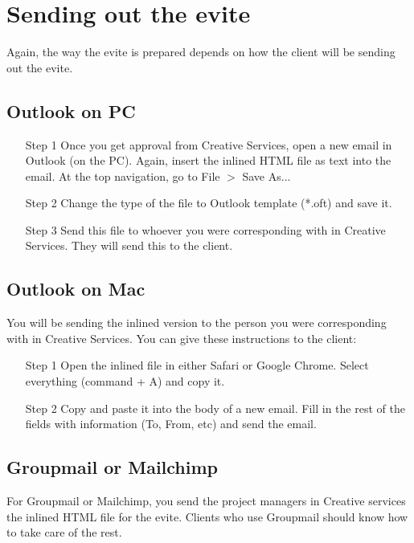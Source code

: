 \documentclass[a4paper,11pt]{article}
\begin{document}
	\section{Sending out the evite}
	Again, the way the evite is prepared depends on how the client will be sending out the evite.
	\subsection{Outlook on PC}
	\begin{itemize}
		\item[Step 1] Once you get approval from Creative Services, open a new email in Outlook (on the PC). Again, insert the inlined HTML file as text into the email. At the top navigation, go to File $>$ Save As...
		\item[Step 2] Change the type of the file to Outlook template (*.oft) and save it.
		\item[Step 3] Send this file to whoever you were corresponding with in Creative Services. They will send this to the client.
	\end{itemize}
	\subsection{Outlook on Mac}
	You will be sending the inlined version to the person you were corresponding with in Creative Services. You can give these instructions to the client:
	\begin{itemize}
		\item[Step 1] Open the inlined file in either Safari or Google Chrome. Select everything (command + A) and copy it.
		\item[Step 2] Copy and paste it into the body of a new email. Fill in the rest of the fields with information (To, From, etc) and send the email.
	\end{itemize}
	\subsection{Groupmail or Mailchimp}
	For Groupmail or Mailchimp, you send the project managers in Creative services the inlined HTML file for the evite. Clients who use Groupmail should know how to take care of the rest.
	
	
	
\end{document}
